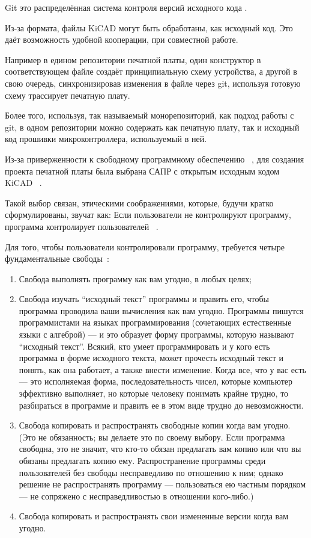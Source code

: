 Git это распределённая система контроля версий 
исходного кода \cite{git-dvcs}.

Из-за формата, файлы KiCAD могут быть обработаны, как
исходный код.
Это даёт возможность удобной кооперации, при совместной работе.

Например в едином репозитории печатной платы, один конструктор в
соответствующем файле создаёт принципиальную схему устройства, а
другой в свою очередь, синхронизировав изменения в файле через
git, используя готовую схему трассирует печатную плату.

Более того, используя, так называемый монорепозиторий, как подход
работы с git, в одном репозитории можно содержать как
печатную плату, так и исходный код прошивки микроконтроллера,
используемый в ней.

Из-за приверженности к свободному программному обеспечению
~\cite{GNU-philosophy}, для создания проекта печатной платы была
выбрана САПР с открытым исходным кодом KiCAD
~\cite{kicad-license}.

Такой выбор связан, этическими соображениями, которые, будучи
кратко сформулированы, звучат как:
Если пользователи не контролируют программу,
программа контролирует пользователей ~\cite{unfair-nonfree-programms}.

Для того, чтобы пользователи контролировали программу, требуется
четыре фундаментальные свободы~\cite{unfair-nonfree-programms}:

\begin{enumerate}
\item Свобода выполнять программу как вам угодно, в любых целях;
  
\item Свобода изучать “исходный текст” программы и править его, чтобы
программа проводила ваши вычисления как вам угодно. Программы пишутся
программистами на языках программирования (сочетающих естественные
языки с алгеброй) — и это образует форму программы, которую называют
“исходный текст”. Всякий, кто умеет программировать и у кого есть
программа в форме исходного текста, может прочесть исходный текст и
понять, как она работает, а также внести изменение. Когда все, что у
вас есть — это исполняемая форма, последовательность чисел, которые
компьютер эффективно выполняет, но которые человеку понимать крайне
трудно, то разбираться в программе и править ее в этом виде трудно до
невозможности.

\item  Свобода копировать и распространять свободные копии когда вам
угодно. (Это не обязанность; вы делаете это по своему выбору. Если
программа свободна, это не значит, что кто-то обязан предлагать вам
копию или что вы обязаны предлагать копию ему. Распространение
программы среди пользователей без свободы несправедливо по отношению к
ним; однако решение не распространять программу — пользоваться ею
частным порядком — не сопряжено с несправедливостью в отношении
кого-либо.)

\item Свобода копировать и распространять свои измененные версии когда
вам угодно.
\end{enumerate}

